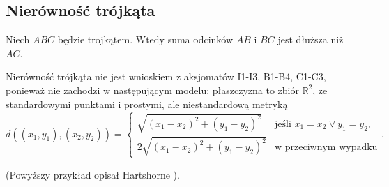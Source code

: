 
\subsection{Nierówność trójkąta}

\begin{proposition}
	Niech $ABC$ będzie trojkątem.
	Wtedy suma odcinków $AB$ i $BC$ jest dłuższa niż $AC$.
\end{proposition}

Nierówność trójkąta nie jest wnioskiem z aksjomatów I1-I3, B1-B4, C1-C3, ponieważ nie zachodzi w następującym modelu: płaszczyzna to zbiór $\mathbb R^2$, ze standardowymi punktami i prostymi, ale niestandardową metryką
\begin{equation}
	d((x_1, y_1), (x_2, y_2)) = \begin{cases}
		\sqrt{(x_1-x_2)^2 + (y_1-y_2)^2} & \text{jeśli } x_1 = x_2 \vee y_1 = y_2, \\
		2 \sqrt{(x_1-x_2)^2 + (y_1-y_2)^2} & \text{w przeciwnym wypadku}
	\end{cases}.
\end{equation}

(Powyższy przykład opisał Hartshorne \cite[s. 90]{hartshorne2000}).